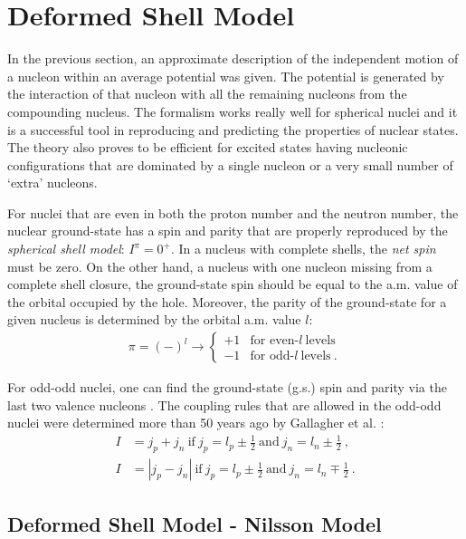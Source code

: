 \section{Deformed Shell Model}

In the previous section, an approximate description of the independent motion of a nucleon within an average potential was given. The potential is generated by the interaction of that nucleon with all the remaining nucleons from the compounding nucleus. The formalism works really well for spherical nuclei and it is a successful tool in reproducing and predicting the properties of nuclear states. The theory also proves to be efficient for excited states having nucleonic configurations that are dominated by a single nucleon or a very small number of `extra' nucleons.

For nuclei that are even in both the proton number and the neutron number, the nuclear ground-state has a spin and parity that are properly reproduced by the \emph{spherical shell model}: $I^\pi=0^+$. In a nucleus with complete shells, the \emph{net spin} must be zero. On the other hand, a nucleus with one nucleon missing from a complete shell closure, the ground-state spin should be equal to the a.m. value of the orbital occupied by the hole. Moreover, the parity of the ground-state for a given nucleus is determined by the orbital a.m. value $l$:
\begin{align}
    \pi=(-)^l\to
    \begin{cases}
        +1 &\text{for even-}l\ \text{levels}\\
        -1 &\text{for odd-}l\ \text{levels}\ .
    \end{cases}
\end{align}

For odd-odd nuclei, one can find the ground-state (g.s.) spin and parity via the last two valence nucleons \cite{krane1991introductory,bertulani2007nuclear}. The coupling rules that are allowed in the odd-odd nuclei were determined more than 50 years ago by Gallagher et al. \cite{gallagher1958coupling}:
\begin{align}
    I&=j_p+j_n\ \text{if}\ j_p=l_p\pm\frac{1}{2}\ \text{and}\ j_n=l_n\pm\frac{1}{2}\ ,\\
    I&=|j_p-j_n|\ \text{if}\ j_p=l_p\pm\frac{1}{2}\ \text{and}\ j_n=l_n\mp\frac{1}{2}\ .
\end{align}

\subsection{Deformed Shell Model - Nilsson Model}
\label{nilsson-model-section}

